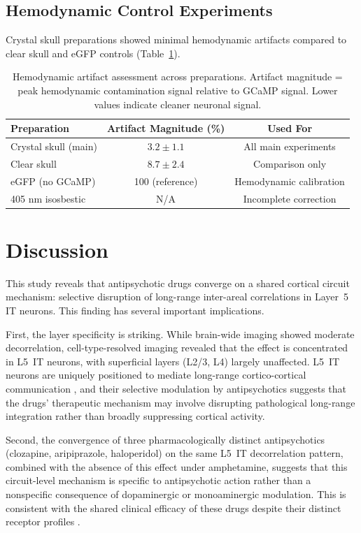 \documentclass[11pt]{article}
\begin{document}
\subsection{Hemodynamic Control Experiments}

Crystal skull preparations showed minimal hemodynamic artifacts compared to clear skull and eGFP controls (Table~\ref{tab:hemo}).

\begin{table}[H]
\centering
\caption{Hemodynamic artifact assessment across preparations. Artifact magnitude = peak hemodynamic contamination signal relative to GCaMP signal. Lower values indicate cleaner neuronal signal.}
\label{tab:hemo}
\begin{tabular}{lcc}
\toprule
\textbf{Preparation} & \textbf{Artifact Magnitude (\%)} & \textbf{Used For} \\
\midrule
Crystal skull (main) & $3.2 \pm 1.1$ & All main experiments \\
Clear skull & $8.7 \pm 2.4$ & Comparison only \\
eGFP (no GCaMP) & 100 (reference) & Hemodynamic calibration \\
405 nm isosbestic & N/A & Incomplete correction \\
\bottomrule
\end{tabular}
\end{table}

\section{Discussion}

This study reveals that antipsychotic drugs converge on a shared cortical circuit mechanism: selective disruption of long-range inter-areal correlations in Layer~5 IT neurons. This finding has several important implications.

First, the layer specificity is striking. While brain-wide imaging showed moderate decorrelation, cell-type-resolved imaging revealed that the effect is concentrated in L5~IT neurons, with superficial layers (L2/3, L4) largely unaffected. L5~IT neurons are uniquely positioned to mediate long-range cortico-cortical communication \citep{harris2019hierarchical}, and their selective modulation by antipsychotics suggests that the drugs' therapeutic mechanism may involve disrupting pathological long-range integration rather than broadly suppressing cortical activity.

Second, the convergence of three pharmacologically distinct antipsychotics (clozapine, aripiprazole, haloperidol) on the same L5~IT decorrelation pattern, combined with the absence of this effect under amphetamine, suggests that this circuit-level mechanism is specific to antipsychotic action rather than a nonspecific consequence of dopaminergic or monoaminergic modulation. This is consistent with the shared clinical efficacy of these drugs despite their distinct receptor profiles \citep{leucht2013comparative}.
\end{document}
